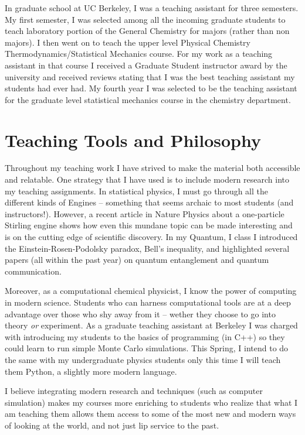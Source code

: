 \documentclass[11pt]{article}
\begin{document}
In graduate school at UC Berkeley, I was a teaching assistant for three semesters.  My first semester, I was selected among all the incoming graduate students to teach laboratory portion of the General Chemistry for majors (rather than non majors). I then went on to teach the upper level Physical Chemistry Thermodynamics/Statistical Mechanics course.  For my work as a teaching assistant in that course I received a Graduate Student instructor award by the university and received reviews stating that I was the best teaching assistant my students had ever had.  My fourth year I was selected to be the teaching assistant for the graduate level statistical mechanics course in the chemistry department.

\section{Teaching Tools and Philosophy}

Throughout my teaching work I have strived to make the material both accessible and relatable.  One strategy that I have used is to include modern research into my teaching assignments.  In statistical physics, I must go through all the different kinds of Engines -- something that seems archaic to most students (and instructors!).  However, a recent article in Nature Physics about a one-particle Stirling engine shows how even this mundane topic can be made interesting and is on the cutting edge of scientific discovery.  In my Quantum, I class I introduced the Einstein-Rosen-Podolsky paradox, Bell's inequality, and highlighted several papers (all within the past year) on quantum entanglement and quantum communication.

Moreover, as a computational chemical physicist, I know the power of computing in modern science.  Students who can harness computational tools are at a deep advantage over those who shy away from it  -- wether they choose to go into theory \emph{or} experiment.  As a graduate teaching assistant at Berkeley I was charged with introducing my students to the basics of programming (in C++) so they could learn to run simple Monte Carlo simulations.  This Spring, I intend to do the same with my undergraduate physics students only this time I will teach them Python, a slightly more modern language.

I believe integrating modern research and techniques (such as computer simulation) makes my courses more enriching to students who realize that what I am teaching them allows them access to some of the most new and modern ways of looking at the world, and not just lip service to the past.
\end{document}
